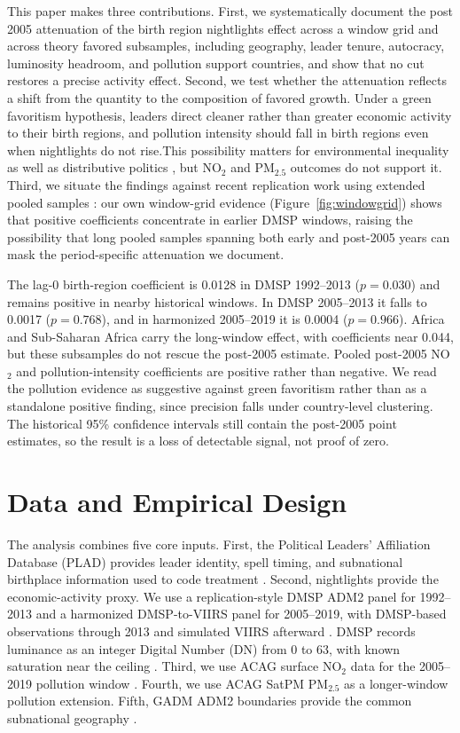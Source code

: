 \documentclass[9pt,twocolumn,twoside]{pnas-new}
\newcommand{\new}[1]{#1}
\begin{document}
\new{This paper makes three contributions. First, we systematically document the post 2005 attenuation of the birth region nightlights effect across a window grid and across theory favored subsamples, including geography, leader tenure, autocracy, luminosity headroom, and pollution support countries, and show that no cut restores a precise activity effect. Second, we test whether the attenuation reflects a shift from the quantity to the composition of favored growth. Under a green favoritism hypothesis, leaders direct cleaner rather than greater economic activity to their birth regions, and pollution intensity should fall in birth regions even when nightlights do not rise.This possibility matters for environmental inequality as well as distributive politics \cite{CopelandTaylor2004}, but NO$_2$ and PM$_{2.5}$ outcomes do not support it. Third, we situate the findings against recent replication work using extended pooled samples \cite{Bora2025, DubenHodlerRaschky2026}: our own window-grid evidence (Figure~\ref{fig:windowgrid}) shows that positive coefficients concentrate in earlier DMSP windows, raising the possibility that long pooled samples spanning both early and post-2005 years can mask the period-specific attenuation we document.}

\new{The lag-0 birth-region coefficient is 0.0128 in DMSP 1992--2013 ($p = 0.030$) and remains positive in nearby historical windows. In DMSP 2005--2013 it falls to 0.0017 ($p = 0.768$), and in harmonized 2005--2019 it is 0.0004 ($p = 0.966$). Africa and Sub-Saharan Africa carry the long-window effect, with coefficients near 0.044, but these subsamples do not rescue the post-2005 estimate. Pooled post-2005 NO$_2$ and pollution-intensity coefficients are positive rather than negative. We read the pollution evidence as suggestive against green favoritism rather than as a standalone positive finding, since precision falls under country-level clustering. The historical 95\% confidence intervals still contain the post-2005 point estimates, so the result is a loss of detectable signal, not proof of zero.}

\section{Data and Empirical Design}

The analysis combines five core inputs. First, the Political Leaders' Affiliation Database (PLAD) provides leader identity, spell timing, and subnational birthplace information used to code treatment \cite{Bomprezzi2025PLAD}. Second, nightlights provide the economic-activity proxy. We use a replication-style DMSP ADM2 panel for 1992--2013 and a harmonized DMSP-to-VIIRS panel for 2005--2019, with DMSP-based observations through 2013 and simulated VIIRS afterward \cite{Elvidge2013VIIRS}. DMSP records luminance as an integer Digital Number (DN) from 0 to 63, with known saturation near the ceiling \cite{Gibson2021}. Third, we use ACAG surface NO$_2$ data for the 2005--2019 pollution window \cite{Cooper2022NO2}. Fourth, we use ACAG SatPM PM$_{2.5}$ as a longer-window pollution extension. Fifth, GADM ADM2 boundaries provide the common subnational geography \cite{GADM2022}.
\end{document}
